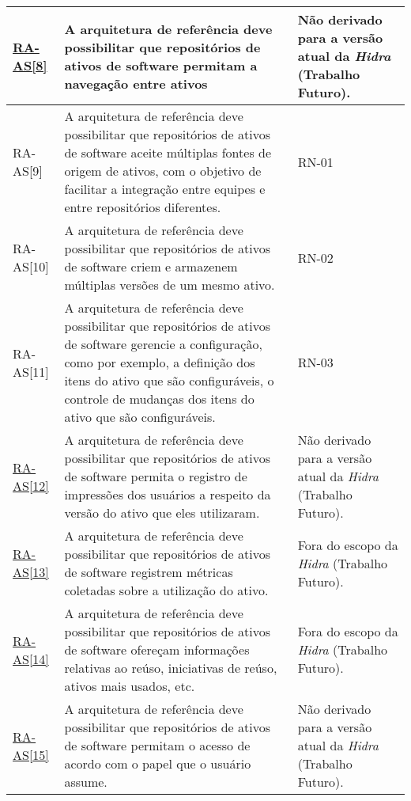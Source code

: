 \begin{longtable}{ | l | p{9cm} | p{3cm} |}
    \underline{RA-AS[8]}
    & A arquitetura de referência deve possibilitar que  repositórios de ativos de software permitam a  navegação entre ativos 
    & Não derivado para a versão atual da \textit{Hidra} (Trabalho Futuro). 
    \\ \hline
    
    RA-AS[9] 
    & A arquitetura de referência deve possibilitar que  repositórios de ativos de software aceite múltiplas  fontes de origem de ativos, com o objetivo de facilitar  a integração entre equipes e entre repositórios  diferentes.  
    & RN-01
    \\ \hline
 
    RA-AS[10]
    & A arquitetura de referência deve possibilitar que  repositórios de ativos de software criem e armazenem  múltiplas versões de um mesmo ativo.
    & RN-02
    \\ \hline

    RA-AS[11] 
    & A arquitetura de referência deve possibilitar que  repositórios de ativos de software gerencie a  configuração, como por exemplo, a definição dos itens  do ativo que são configuráveis, o controle de  mudanças dos itens do ativo que são configuráveis.
    & RN-03
    \\ \hline
    
    \underline{RA-AS[12]}
    &A arquitetura de referência deve possibilitar que  repositórios de ativos de software permita o registro de  impressões dos usuários a respeito da versão do ativo  que eles utilizaram. 
    & Não derivado para a versão atual da \textit{Hidra} (Trabalho Futuro).
    \\ \hline

    \underline{RA-AS[13]}
    & A arquitetura de referência deve possibilitar que  repositórios de ativos de software registrem métricas  coletadas sobre a utilização do ativo.
    & Fora do escopo da \textit{Hidra} (Trabalho Futuro).
    \\ \hline

    \underline{RA-AS[14]}
    & A arquitetura de referência deve possibilitar que  repositórios de ativos de software ofereçam  informações relativas ao reúso, iniciativas de reúso,  ativos mais usados, etc.
    & Fora do escopo da \textit{Hidra} (Trabalho Futuro). 
    \\ \hline
    
    \underline{RA-AS[15]}
    & A arquitetura de referência deve possibilitar que  repositórios de ativos de software permitam o acesso de acordo com o papel que o usuário assume.
    & Não derivado para a versão atual da \textit{Hidra} (Trabalho Futuro). 
    \\ \hline


\end{longtable}
